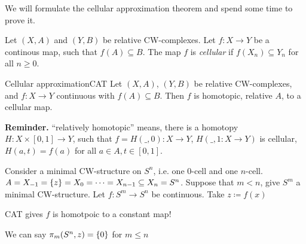 \documentclass{TemplateLecture}
\begin{document}
We will formulate the cellular approximation theorem and spend some time to prove it.

\begin{defi}{}{}
    Let \((X,A)\) and \((Y,B)\) be relative CW-complexes. Let \(f \colon X\to Y\) be a continous map, such that \(f(A) \subseteq B\). The map \(f\) is \emph{cellular} if \(f(X_n) \subseteq Y_n\) for all \(n \geq 0\).
\end{defi}

\begin{thm}{Cellular approximation}{CAT}
    Let \((X,A)\), \((Y,B)\) be relative CW-complexes, and \(f\colon X \to Y\) continuous with \(f(A) \subseteq B\). Then \(f\) is homotopic, relative \(A\), to a cellular map.
\end{thm}

\textbf{Reminder.} \enquote{relatively homotopic} means, there is a homotopy \(H\colon X\times [0,1] \to Y\), such that \(f = H(\_, 0) \colon X \to Y\), \(H(\_, 1\colon X \to Y)\) is cellular, \(H(a,t) = f(a)\) for all \(a \in A, t \in [0,1]\).

\begin{example}
    Consider a minimal CW-structure on \(S^n\), i.e. one \(0\)-cell and one \(n\)-cell.
    \(A = X_{-1} = \{z\} = X_0 = \dots = X_{n-1} \subseteq X_n = S^n\).
    Suppose that \(m < n\), give \(S^m\) a minimal CW-structure. Let \(f\colon S^m \to S^n\) be continuous. Take \(z \coloneq f(x)\)

    CAT gives \(f\) is homotpoic to a constant map!

    We can say \(\pi_m(S^n, z) = \{0\}\) for \(m \leq n\)
\end{example}
\end{document}
